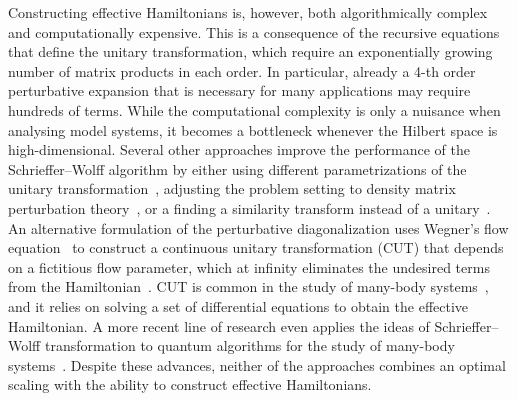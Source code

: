 Constructing effective Hamiltonians is, however, both algorithmically complex and computationally expensive.
This is a consequence of the recursive equations that define the unitary transformation, which require an exponentially growing number of matrix products in each order.
In particular, already a 4-th order perturbative expansion that is necessary for many applications may require hundreds of terms.
While the computational complexity is only a nuisance when analysing model systems, it becomes a bottleneck whenever the Hilbert space is high-dimensional.
Several other approaches improve the performance of the Schrieffer--Wolff algorithm by either using different parametrizations of the unitary transformation~\cite{Van_Vleck_1929, Lowdin_1962, Shavitt_1980, Klein_1974, Suzuki_1983}, adjusting the problem setting to density matrix perturbation theory~\cite{McWeeny_1962, Truflandier_2020}, or a finding a similarity transform instead of a unitary~\cite{Bloch_1958}.
An alternative formulation of the perturbative diagonalization uses Wegner's flow equation~\cite{Wegner_1994,Kehrein_2007} to construct a continuous unitary transformation (CUT) that depends on a fictitious flow parameter, which at infinity eliminates the undesired terms from the Hamiltonian~\cite{Knetter_2000,Oitmaa_2006}.
CUT is common in the study of many-body systems~\cite{Krull_2012}, and it relies on solving a set of differential equations to obtain the effective Hamiltonian.
A more recent line of research even applies the ideas of Schrieffer--Wolff transformation to quantum algorithms for the study of many-body systems~\cite{Wurtz_2020, Zhang_2022}.
Despite these advances, neither of the approaches combines an optimal scaling with the ability to construct effective Hamiltonians.

